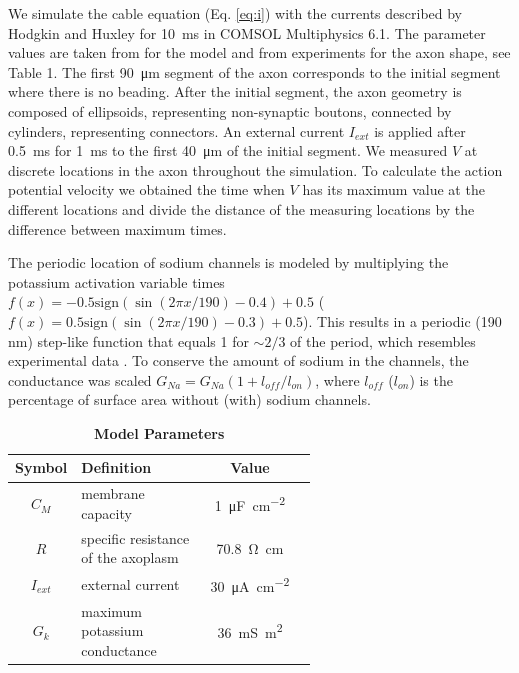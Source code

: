 \documentclass[11pt]{article}
\begin{document}
We simulate the cable equation (Eq. \eqref{eq:i}) with the currents described by Hodgkin and Huxley for \SI{10}{\milli\second} in COMSOL Multiphysics 6.1. The parameter values are taken from \cite{koch2004biophysics} for the model and from experiments for the axon shape, see Table 1. The first \SI{90}{\micro\meter} segment of the axon corresponds to the initial segment where there is no beading. After the initial segment, the axon geometry is composed of ellipsoids, representing non-synaptic boutons, connected by cylinders, representing connectors. An external current $I_{ext}$ is applied after \SI{0.5}{\milli\second} for \SI{1}{\milli\second} to the first \SI{40}{\micro\meter} of the initial segment. We measured $V$ at discrete locations in the axon throughout the simulation. To calculate the action potential velocity we obtained the time when $V$ has its maximum value at the different locations and divide the distance of the measuring locations by the difference between maximum times. 

The periodic location of sodium channels is modeled by multiplying the potassium activation variable times $f(x) = -0.5 \mathrm{sign} ( \sin (2\pi x/190)-0.4)+0.5 $ ($f(x) = 0.5 \mathrm{sign} ( \sin (2\pi x/190)-0.3)+0.5 $). This results in a periodic (190 nm) step-like function that equals 1 for $\sim 2/3$ of the period, which resembles experimental data \cite{xu2013actin}. To conserve the amount of sodium in the channels, the conductance was scaled $G_{Na} = G_{Na} ( 1 + l_{off}/l_{on})$, where $l_{off}$ ($l_{on}$) is the percentage of surface area without (with) sodium channels.

\begin{table}[H]
\centering
\caption{\label{table:AP} \textbf{Model Parameters}}
\begin{tabular}{ |c|p{0.6\linewidth}|c|c| } 
 \hline
 Symbol & Definition & Value \\ \hline \hline
 $C_M$ & membrane capacity & \SI{1}{\micro\farad\per\centi\meter\squared}  \\ \hline
  $R$ & specific resistance of the axoplasm  & \SI{70.8}{\ohm\centi\meter}  \\ \hline
$I_{ext}$ & external current  & \SI{30}{\micro\ampere\per\centi\meter\squared}  \\ \hline
$G_{k}$ & maximum potassium conductance  & \SI{36}{\milli\siemens\meter\squared}  \\ \hline
 
\end{tabular}
\end{table}


\printbibliography
\end{document}
